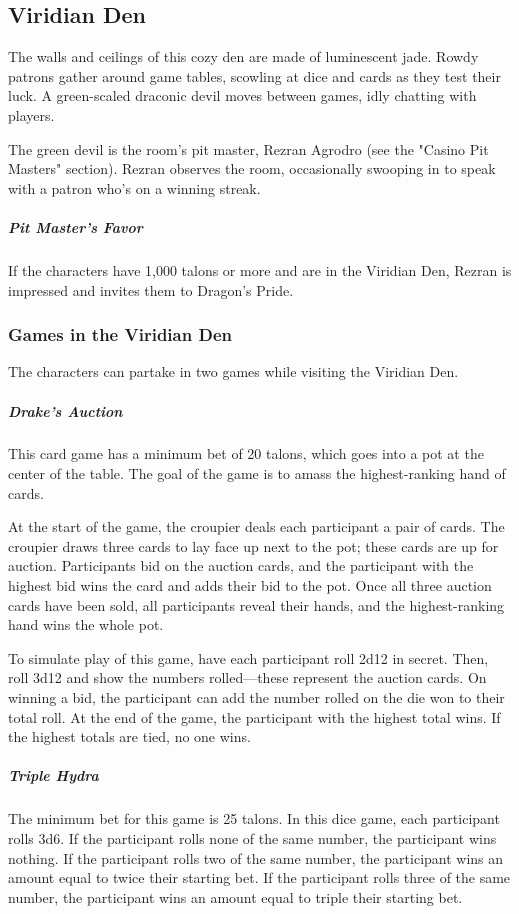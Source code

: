 \documentclass[10pt,a4paper,twoside,bg=print,twocolumn,openany,nodeprecatedcode]{dndbook}
\begin{document}
\subsection{Viridian Den}
\begin{DndReadAloud}{}
The walls and ceilings of this cozy den are made of luminescent jade. Rowdy patrons gather around game tables, scowling at dice and cards as they test their luck. A green-scaled draconic devil moves between games, idly chatting with players.

\end{DndReadAloud}

The green devil is the room's pit master, Rezran Agrodro (see the "Casino Pit Masters" section). Rezran observes the room, occasionally swooping in to speak with a patron who's on a winning streak.

\subparagraph{Pit Master's Favor}
If the characters have 1,000 talons or more and are in the Viridian Den, Rezran is impressed and invites them to Dragon's Pride.

\subsubsection{Games in the Viridian Den}
The characters can partake in two games while visiting the Viridian Den.

\subparagraph{Drake's Auction}
This card game has a minimum bet of 20 talons, which goes into a pot at the center of the table. The goal of the game is to amass the highest-ranking hand of cards.

At the start of the game, the croupier deals each participant a pair of cards. The croupier draws three cards to lay face up next to the pot; these cards are up for auction. Participants bid on the auction cards, and the participant with the highest bid wins the card and adds their bid to the pot. Once all three auction cards have been sold, all participants reveal their hands, and the highest-ranking hand wins the whole pot.

To simulate play of this game, have each participant roll 2d12 in secret. Then, roll 3d12 and show the numbers rolled—these represent the auction cards. On winning a bid, the participant can add the number rolled on the die won to their total roll. At the end of the game, the participant with the highest total wins. If the highest totals are tied, no one wins.

\subparagraph{Triple Hydra}
The minimum bet for this game is 25 talons. In this dice game, each participant rolls 3d6. If the participant rolls none of the same number, the participant wins nothing. If the participant rolls two of the same number, the participant wins an amount equal to twice their starting bet. If the participant rolls three of the same number, the participant wins an amount equal to triple their starting bet.
\end{document}
